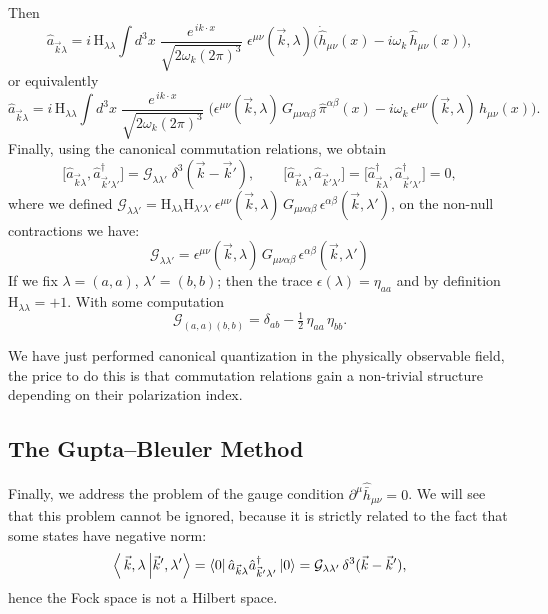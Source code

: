 \documentclass[12pt,a4paper,oneside]{article}
\numberwithin{equation}{section}   %
\begin{document}
Then
\begin{equation}\boxed{
    \hat a_{\vec{k}\lambda}
= i\,\mathrm{H}_{\lambda\lambda}\!\int\! d^3x\;
\frac{e^{\,ik\cdot x}}{\sqrt{2\omega_k(2\pi)^3}}\;
\epsilon^{\mu\nu}(\vec{k},\lambda)
\Big(\dot{\hat h}_{\mu\nu}(x) - i\omega_k\, \hat h_{\mu\nu}(x)\Big),
}\end{equation}
or equivalently
\begin{equation}\boxed{
    \hat a_{\vec{k}\lambda}
= i\,\mathrm{H}_{\lambda\lambda}\!\int\! d^3x\;
\frac{e^{\,ik\cdot x}}{\sqrt{2\omega_k(2\pi)^3}}\;
\Big(\epsilon^{\mu\nu}(\vec{k},\lambda)\,G_{\mu\nu\alpha\beta}\,\hat \pi^{\alpha\beta}(x)
- i\omega_k\, \epsilon^{\mu\nu}(\vec{k},\lambda)\,\hat h_{\mu\nu}(x)\Big)
.}\end{equation}
Finally, using the canonical commutation relations, we obtain
\begin{equation}
\boxed{
\bigl[\hat a_{\vec k\lambda},\hat a^{\dagger}_{\vec k'\lambda'}\bigr]
= \mathcal G_{\lambda\lambda'}\;\delta^{3}(\vec k-\vec k'),
  \qquad
  \bigl[\hat a_{\vec k\lambda},\hat a_{\vec k'\lambda'}\bigr]
  = \bigl[\hat a^{\dagger}_{\vec k\lambda},
          \hat a^{\dagger}_{\vec k'\lambda'}\bigr]=0 ,
}
\label{eq:ETCR-ladder}
\end{equation}
where we defined
$\mathcal G_{\lambda\lambda'} = \mathrm{H}_{\lambda\lambda}\mathrm{H}_{\lambda'\lambda'}\,
\epsilon^{\mu\nu}(\vec k,\lambda)\,G_{\mu\nu\alpha\beta}\,\epsilon^{\alpha\beta}(\vec k,\lambda')
$, on the non-null contractions we have:
\begin{equation}
  \mathcal G_{\lambda\lambda'} =
  \epsilon^{\mu\nu}(\vec k,\lambda)\,G_{\mu\nu\alpha\beta}\,\epsilon^{\alpha\beta}(\vec k,\lambda')
\end{equation}
If we fix $\lambda=(a,a)$, $\lambda'=(b,b)$;
then the trace $\epsilon(\lambda)=\eta_{aa}$ and by definition
$\mathrm{H}_{\lambda\lambda}=+1$. With some computation
\begin{equation}
\mathcal G_{(a,a)(b,b)}=\delta_{ab}-\tfrac12\,\eta_{aa}\,\eta_{bb}.
\end{equation}

We have just performed canonical quantization in the physically observable field,
the price to do this is that commutation relations gain a non-trivial structure
depending on their polarization index.
\subsection{The Gupta--Bleuler Method}
Finally, we address the problem of the gauge condition $\partial^\mu\hat{\bar h}_{\mu\nu}=0$.
We will see that this problem cannot be ignored, because it is strictly related to the
fact that some states have negative norm:
\begin{equation}
\bra{\,\vec k,\lambda\,}\ket{\vec k',\lambda'}=\bra0\hat a_{\vec k\lambda}\hat a^\dagger_{\vec k'\lambda'}\ket0=\mathcal G_{\lambda\lambda'}\,\delta^3(\vec k-\vec k'),
\end{equation}
hence the Fock space is not a Hilbert space.
\end{document}

